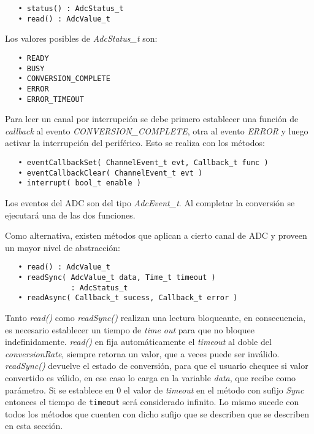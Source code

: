 \begin{verbatim}
   • status() : AdcStatus_t
   • read() : AdcValue_t
\end{verbatim}

Los valores posibles de \emph{AdcStatus\_t} son: 


\begin{verbatim}
   • READY
   • BUSY
   • CONVERSION_COMPLETE
   • ERROR
   • ERROR_TIMEOUT
\end{verbatim}

Para leer un canal por interrupción se debe primero establecer una función de \emph{callback} al evento \emph{CONVERSION\_COMPLETE}, otra al evento \emph{ERROR} y luego activar la interrupción del periférico. Esto se realiza con los métodos:

\begin{verbatim}
   • eventCallbackSet( ChannelEvent_t evt, Callback_t func )
   • eventCallbackClear( ChannelEvent_t evt )
   • interrupt( bool_t enable )
\end{verbatim}

Los eventos del ADC son del tipo \emph{AdcEvent\_t}. Al completar la conversión se ejecutará una de las dos funciones.


Como alternativa, existen métodos que aplican a cierto canal de ADC y proveen un mayor nivel de abstracción:

\begin{verbatim}
   • read() : AdcValue_t
   • readSync( AdcValue_t data, Time_t timeout )
               : AdcStatus_t
   • readAsync( Callback_t sucess, Callback_t error )
\end{verbatim}

Tanto \emph{read()} como \emph{readSync()} realizan una lectura bloqueante, en consecuencia, es necesario establecer un tiempo de \textit{time out} para que no bloquee indefinidamente. \emph{read()} en fija automáticamente el \emph{timeout} al doble del \emph{conversionRate}, siempre retorna un valor, que a veces puede ser inválido. \emph{readSync()} devuelve el estado de conversión, para que el usuario chequee si valor convertido es válido, en ese caso lo carga en la variable \emph{data}, que recibe como parámetro. Si se establece en 0 el valor de \emph{timeout} en el método con sufijo \emph{Sync} entonces el tiempo de \texttt{timeout} será considerado infinito. Lo mismo sucede con todos los métodos que cuenten con dicho sufijo que se describen que se describen en esta sección.

